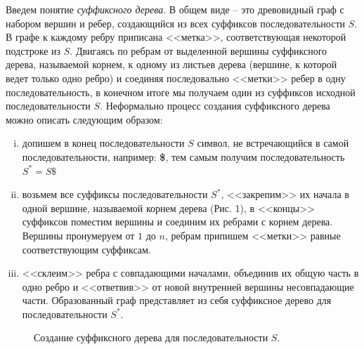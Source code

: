 \documentclass[letterpaper, 11pt]{article}
\begin{document}
Введем понятие \textit{суффиксного дерева}. В общем виде -- это древовидный граф с набором вершин и ребер, создающийся из всех суффиксов последовательности $S$. В графе к каждому ребру приписана <<метка>>, соответствующая некоторой подстроке из $S$. Двигаясь по ребрам от выделенной вершины суффиксного дерева, называемой корнем, к одному из листьев дерева (вершине, к которой ведет только одно ребро) и соединяя последовально <<метки>> ребер в одну последовательность, в конечном итоге мы получаем один из суффиксов исходной последовательности $S$. Неформально процесс создания суффиксного дерева можно описать следующим образом:
\begin{enumerate}[(i)]
\item
допишем в конец последовательности $S$ символ, не встречающийся в самой последовательности, например: \textbf{\$}, тем самым получим последовательность $S^{*} = S\$$
\item
возьмем все суффиксы последовательности $S^{*}$, <<закрепим>> их начала в одной вершине, называемой корнем дерева (Рис. 1), в <<концы>> суффиксов поместим вершины и соединим их ребрами с корнем дерева. Вершины пронумеруем от $1$ до $n$, ребрам припишем <<метки>> равные соответствующим суффиксам.
\item
<<склеим>> ребра с совпадающими началами, объединив их общую часть в одно ребро и <<ответвив>> от новой внутренней вершины несовпадающие части. Образованный граф представляет из себя суффиксное дерево для последовательности $S^*$.
\end{enumerate}

\begin{figure}[H]
  \caption{Создание суффиксного дерева для последовательности $S$.}
\end{figure}
\end{document}

